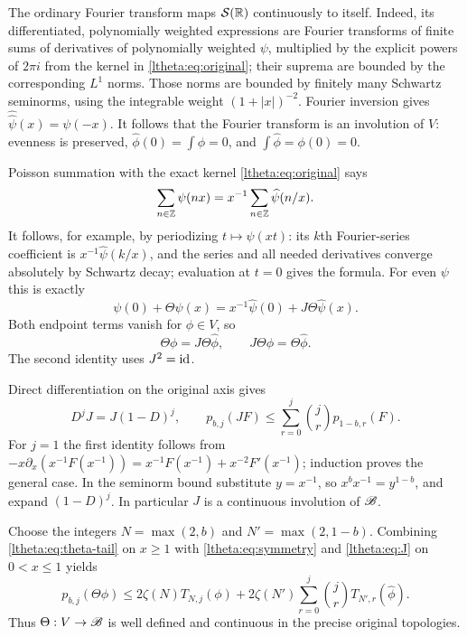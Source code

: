 \documentclass[11pt]{article}
\begin{document}
The ordinary Fourier transform maps $\mathcal S(\mathbb R)$ continuously to itself.
Indeed, its differentiated, polynomially weighted expressions are
Fourier transforms of finite sums of derivatives of polynomially
weighted $\psi$, multiplied by the explicit powers of $2\pi i$ from
the kernel in \eqref{ltheta:eq:original}; their suprema are bounded by the
corresponding $L^1$ norms. Those norms are bounded by finitely many
Schwartz seminorms, using the integrable weight $(1+|x|)^{-2}$.
Fourier inversion gives $\widehat{\widehat\psi}(x)=\psi(-x)$.
It follows that the Fourier transform is an involution of $V$:
evenness is preserved, $\widehat\phi(0)=\int\phi=0$, and
$\int\widehat\phi=\phi(0)=0$.

Poisson summation with the exact kernel \eqref{ltheta:eq:original} says
\[
 \sum_{n\in\mathbb Z}\psi(nx)
    =x^{-1}\sum_{n\in\mathbb Z}\widehat\psi(n/x).
\]
It follows, for example, by periodizing $t\mapsto\psi(xt)$:
its $k$th Fourier-series coefficient is $x^{-1}\widehat\psi(k/x)$,
and the series and all needed derivatives converge absolutely by
Schwartz decay; evaluation at $t=0$ gives the formula.
For even $\psi$ this is exactly
\begin{equation}\label{ltheta:eq:poisson}
 \psi(0)+\Theta\psi(x)
       =x^{-1}\widehat\psi(0)+J\Theta\widehat\psi(x).
\end{equation}
Both endpoint terms vanish for $\phi\in V$, so
\begin{equation}\label{ltheta:eq:symmetry}
 \Theta\phi=J\Theta\widehat\phi,
 \qquad J\Theta\phi=\Theta\widehat\phi.
\end{equation}
The second identity uses $J^2=\operatorname{id}$.

Direct differentiation on the original axis gives
\begin{equation}\label{ltheta:eq:J}
 D^jJ=J(1-D)^j,\qquad
 p_{b,j}(JF)\leq\sum_{r=0}^j\binom jr p_{1-b,r}(F).
\end{equation}
For $j=1$ the first identity follows from
$-x\partial_x(x^{-1}F(x^{-1}))
=x^{-1}F(x^{-1})+x^{-2}F'(x^{-1})$;
induction proves the general case. In the seminorm bound substitute
$y=x^{-1}$, so $x^b x^{-1}=y^{1-b}$, and expand $(1-D)^j$.
In particular $J$ is a continuous involution of $\mathscr B$.

Choose the integers $N=\max(2,b)$ and $N'=\max(2,1-b)$.
Combining \eqref{ltheta:eq:theta-tail} on $x\geq1$ with
\eqref{ltheta:eq:symmetry} and \eqref{ltheta:eq:J} on $0<x\leq1$ yields
\begin{equation}\label{ltheta:eq:theta-continuity}
 p_{b,j}(\Theta\phi)
 \leq2\zeta(N)T_{N,j}(\phi)
  +2\zeta(N')\sum_{r=0}^j\binom jrT_{N',r}(\widehat\phi).
\end{equation}
Thus $\Theta:V\to\mathscr B$ is well defined and continuous in the precise
original topologies.
\end{document}
